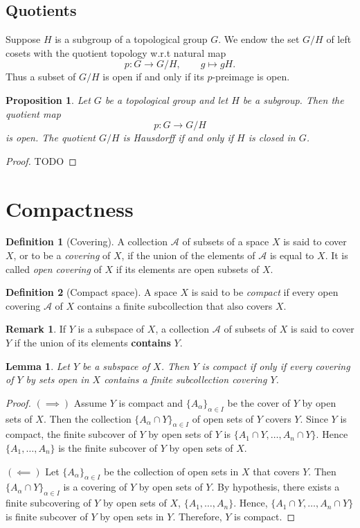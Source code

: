 \documentclass[12pt,reqno]{amsart}
\theoremstyle{plain}
\newtheorem{lem}{Lemma}
\newtheorem{prop}{Proposition}
\theoremstyle{definition}
\newtheorem{defn}{Definition}
\newtheorem{rem}{Remark}
\newcommand{\cal}[1]{\mathcal{#1}}
\begin{document}
\subsection{Quotients}

Suppose $H$ is a subgroup of a topological group $G$. We endow the set $G/H$ of left cosets with the quotient topology w.r.t natural map
$$ p \colon G \to G/H, \qquad g \mapsto gH.$$
Thus a subset of $G/H$ is open if and only if its $p$-preimage is open.

\begin{prop}
    Let $G$ be a topological group and let $H$ be a subgroup. Then the quotient map
    $$ p \colon G \to G/H$$
    is open. The quotient $G/H$ is Hausdorff if and only if $H$ is closed in $G$.
\end{prop}
\begin{proof}
    TODO
\end{proof}
\section{Compactness}
\begin{defn}[Covering]
    A collection $\cal A$ of subsets of a space $X$ is said to cover $X$, or to be a {\it covering} of $X$, if the union of the elements of $\cal A$ is equal to $X$. It is called {\it open covering} of $X$ if its elements are open subsets of $X$. 
\end{defn}
\begin{defn}[Compact space]
    A space $X$ is said to be {\it compact} if every open covering $\cal A$ of $X$ contains a finite subcollection that also covers $X$.
\end{defn}
\begin{rem}
    If $Y$ is a subspace of $X$, a collection $\cal A$ of subsets of $X$ is said to cover $Y$ if the union of its elements {\bf contains} $Y$.
\end{rem}
\begin{lem}
    Let $Y$ be a subspace of $X$. Then $Y$ is compact if only if every covering of $Y$ by sets open in $X$ contains a finite subcollection covering $Y$.
\end{lem}
\begin{proof}
    $(\implies)$ Assume $Y$ is compact and $\{A_\alpha\}_{\alpha \in I}$ be the cover of $Y$ by open sets of $X$. Then the collection $\{A_\alpha \cap Y\}_{\alpha \in I}$ of open sets of $Y$ covers $Y$. Since $Y$ is compact, the finite subcover of $Y$ by open sets of $Y$ is $\{A_1\cap Y, \dots, A_n \cap Y\}$. Hence $\{A_1, \dots, A_n\}$ is the finite subcover of $Y$ by open sets of $X$. 

    \noindent $(\impliedby)$ Let $\{A_\alpha\}_{\alpha \in I}$ be the collection of open sets in $X$ that covers $Y$. Then $\{A_\alpha \cap Y\}_{\alpha \in I}$ is a covering of $Y$ by open sets of $Y$. By hypothesis, there exists a finite subcovering of $Y$ by open sets of $X$, $\{A_1, \dots, A_n\}$. Hence, $\{A_1 \cap Y, \dots, A_n \cap Y\}$ is finite subcover of $Y$ by open sets in $Y$. Therefore, $Y$ is compact.
\end{proof}
\end{document}
